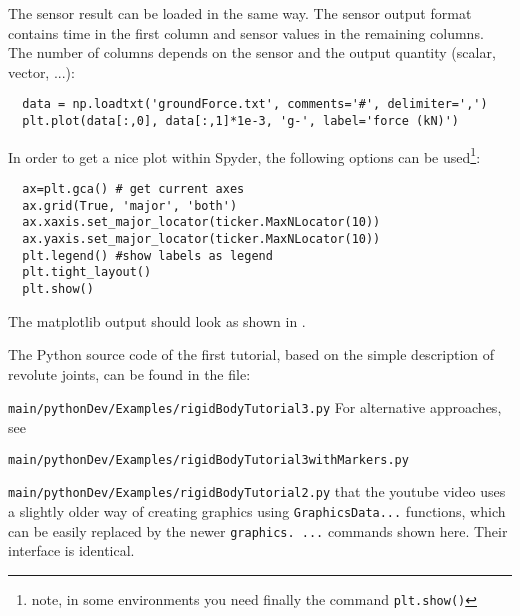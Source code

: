 The sensor result can be loaded in the same way. The sensor output format contains time in the first column and sensor values in the remaining columns. The number of columns depends on the 
sensor and the output quantity (scalar, vector, ...):
\pythonstyle\begin{lstlisting}
  data = np.loadtxt('groundForce.txt', comments='#', delimiter=',')
  plt.plot(data[:,0], data[:,1]*1e-3, 'g-', label='force (kN)')
\end{lstlisting}
%
In order to get a nice plot within Spyder, the following options can be used\footnote{note, in some environments you need finally the command \texttt{plt.show()}}:
\pythonstyle\begin{lstlisting}
  ax=plt.gca() # get current axes
  ax.grid(True, 'major', 'both')
  ax.xaxis.set_major_locator(ticker.MaxNLocator(10))
  ax.yaxis.set_major_locator(ticker.MaxNLocator(10))
  plt.legend() #show labels as legend
  plt.tight_layout()
  plt.show() 
\end{lstlisting}
%
The matplotlib output should look as shown in .
%
%
%
%
%



\newpage
{}
The Python source code of the first tutorial, based on the simple description of revolute joints, can be found in the file:
\bi
  \item[] \texttt{main/pythonDev/Examples/rigidBodyTutorial3.py}
\ei
For alternative approaches, see
\bi
  \item[] \texttt{main/pythonDev/Examples/rigidBodyTutorial3withMarkers.py}
  \item[] \texttt{main/pythonDev/Examples/rigidBodyTutorial2.py}
\ei
{} that the youtube video uses a slightly older way of creating graphics using \texttt{GraphicsData...} functions, which
can be easily replaced by the newer \texttt{graphics. ...} commands shown here. Their interface is identical.

